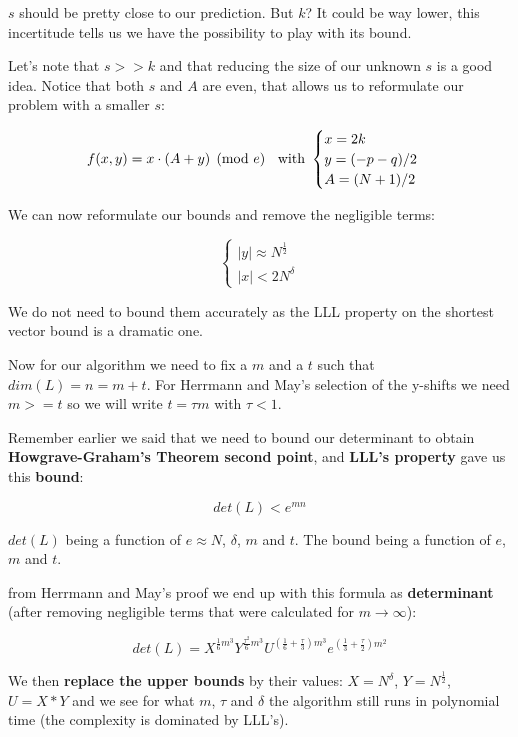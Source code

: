\documentclass[a4paper,11pt]{article}
\begin{document}
$s$ should be pretty close to our prediction. But $k$? It could be way lower, this incertitude tells us we have the possibility to play with its bound.

Let's note that $s >> k$ and that reducing the size of our unknown $s$ is a good idea. Notice that both $s$ and $A$ are even, that allows us to reformulate our problem with a smaller $s$:

\[ f(x,y) = x \cdot ( A + y) \pmod{e}  \hspace{2mm} \mbox{ with } \begin{cases} x = 2k \\
 y = (-p-q)/2\\
 A = (N+1)/2
 \end{cases} \]
 
 We can now reformulate our bounds and remove the negligible terms:

\[ \begin{cases} |y| \approx N^{\frac{1}{2}}\\
|x| < 2N^\delta
\end{cases}\]

We do not need to bound them accurately as the LLL property on the shortest vector bound is a dramatic one.

Now for our algorithm we need to fix a $m$ and a $t$ such that $dim(L) = n = m + t$. For Herrmann and May's selection of the y-shifts we need $m >= t$ so we will write $t = \tau m$ with $\tau < 1$.

Remember earlier we said that we need to bound our determinant to obtain \textbf{Howgrave-Graham's Theorem second point}, and \textbf{LLL's property} gave us this \textbf{bound}:

\[ det(L) < e^{mn} \]

$det(L)$ being a function of $e \approx N$, $\delta$, $m$ and $t$. The bound being a function of $e$, $m$ and $t$.

from Herrmann and May's proof we end up with this formula as \textbf{determinant} (after removing negligible terms that were calculated for $m \rightarrow \infty$):

\[ det(L) = X^{\frac{1}{6}m^3} Y^{\frac{\tau^2}{6}m^3} U^{(\frac{1}{6} + \frac{\tau}{3})m^3} e^{(\frac{1}{3} + \frac{\tau}{2})m^2} \]

We then \textbf{replace the upper bounds} by their values: $X = N^\delta$, $Y = N^{\frac{1}{2}}$, $U = X*Y$ and we see for what $m$, $\tau$ and $\delta$ the algorithm still runs in polynomial time (the complexity is dominated by LLL's).
\end{document}
